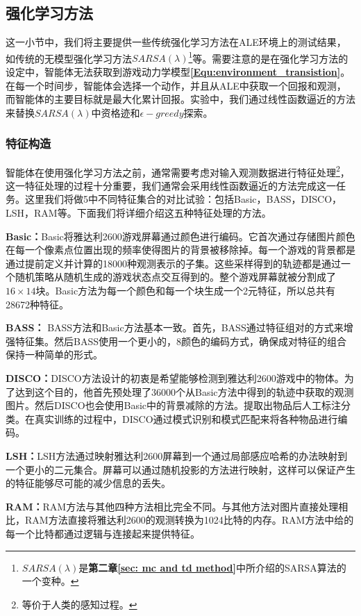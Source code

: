 \subsection{强化学习方法}
这一小节中，我们将主要提供一些传统强化学习方法在ALE环境上的测试结果，如传统的无模型强化学习方法$SARSA(\lambda)$\footnote{$SARSA(\lambda)$是\textbf{第二章\ref{sec: mc and td method}}中所介绍的SARSA算法的一个变种。}等。需要注意的是在强化学习方法的设定中，智能体无法获取到游戏动力学模型\textbf{\eqref{Equ:environment_transistion}}。在每一个时间步，智能体会选择一个动作，并且从ALE中获取一个回报和观测，而智能体的主要目标就是最大化累计回报。实验中，我们通过线性函数逼近的方法来替换$SARSA(\lambda)$中资格迹和$\epsilon-greedy$探索。

\subsubsection{特征构造}
智能体在使用强化学习方法之前，通常需要考虑对输入观测数据进行特征处理\footnote{等价于人类的感知过程。}，这一特征处理的过程十分重要，我们通常会采用线性函数逼近的方法完成这一任务。这里我们将做5中不同特征集合的对比试验：包括Basic，BASS，DISCO，LSH，RAM等。下面我们将详细介绍这五种特征处理的方法。

\textbf{Basic：}Basic将雅达利2600游戏屏幕通过颜色进行编码。它首次通过存储图片颜色在每一个像素点位置出现的频率使得图片的背景被移除掉。每一个游戏的背景都是通过提前定义并计算的18000种观测表示的子集。这些采样得到的轨迹都是通过一个随机策略从随机生成的游戏状态点交互得到的。整个游戏屏幕就被分割成了$16\times 14$块。Basic方法为每一个颜色和每一个块生成一个2元特征，所以总共有28672种特征。

\textbf{BASS：} BASS方法和Basic方法基本一致。首先，BASS通过特征组对的方式来增强特征集。然后BASS使用一个更小的，8颜色的编码方式，确保成对特征的组合保持一种简单的形式。

\textbf{DISCO：}DISCO方法设计的初衷是希望能够检测到雅达利2600游戏中的物体。为了达到这个目的，他首先预处理了36000个从Basic方法中得到的轨迹中获取的观测图片。然后DISCO也会使用Basic中的背景减除的方法。提取出物品后人工标注分类。在真实训练的过程中，DISCO通过模式识别和模式匹配来将各种物品进行编码。

\textbf{LSH：}LSH方法通过映射雅达利2600屏幕到一个通过局部感应哈希的办法映射到一个更小的二元集合。屏幕可以通过随机投影的方法进行映射，这样可以保证产生的特征能够尽可能的减少信息的丢失。

\textbf{RAM：}RAM方法与其他四种方法相比完全不同。与其他方法对图片直接处理相比，RAM方法直接将雅达利2600的观测转换为1024比特的内存。RAM方法中给的每一个比特都通过逻辑与连接起来提供特征。


